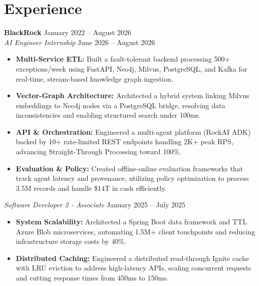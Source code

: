 \documentclass[11pt,a4paper]{article}
\begin{document}
\section{Experience}
\noindent
\textbf{BlackRock} \hfill January 2022 -- August 2026 \\
\textit{AI Engineer Internship} \hfill June 2026 -- August 2026
\begin{itemize}[leftmargin=*,noitemsep,topsep=0pt]
    \item \textbf{Multi-Service ETL:} Built a fault-tolerant backend processing 500+ exceptions/week using FastAPI, Neo4j, Milvus, PostgreSQL, and Kafka for real-time, stream-based knowledge graph ingestion.
    \item \textbf{Vector-Graph Architecture:} Architected a hybrid system linking Milvus embeddings to Neo4j nodes via a PostgreSQL bridge, resolving data inconsistencies and enabling structured search under 100ms.
    \item \textbf{API \& Orchestration:} Engineered a multi-agent platform (RockAI ADK) backed by 10+ rate-limited REST endpoints handling 2K+ peak RPS, advancing Straight-Through Processing toward 100\%.
    \item \textbf{Evaluation \& Policy:} Created offline-online evaluation frameworks that track agent latency and provenance, utilizing policy optimization to process 3.5M records and handle \$14T in cash efficiently.
\end{itemize}

\vspace{3pt}
\noindent
\textit{Software Developer 2 - Associate} \hfill January 2025 -- July 2025
\begin{itemize}[leftmargin=*,noitemsep,topsep=0pt]
    \item \textbf{System Scalability:} Architected a Spring Boot data framework and TTL Azure Blob microservices, automating 1.5M+ client touchpoints and reducing infrastructure storage costs by 40\%.
    \item \textbf{Distributed Caching:} Engineered a distributed read-through Ignite cache with LRU eviction to address high-latency APIs, scaling concurrent requests and cutting response times from 450ms to 150ms.
\end{itemize}
\end{document}

